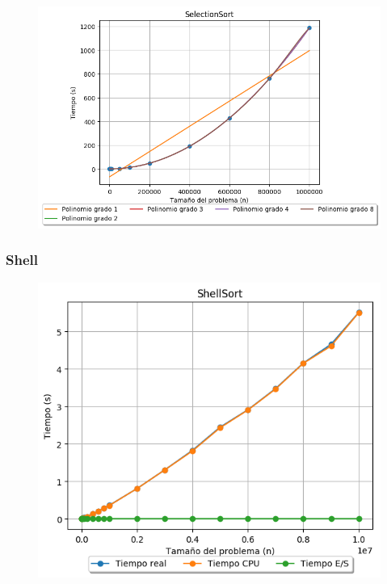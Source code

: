 \documentclass[12pt, fleqn]{report}                             %
\theoremstyle{break}                                            %
\begin{document}
    	        \begin{figure}[H]
    	            \centering
    	            \includegraphics[scale=0.86]{graphics/SelectionSort-Polynomials.png}
    	        \end{figure}
    	        
    	    \subsubsection{Shell}
    	        \begin{figure}[H]
    	            \centering
    	            \includegraphics[scale=0.86]{graphics/ShellSort-ExperimentalTimes.png}
    	        \end{figure}
    	        
\end{document}
